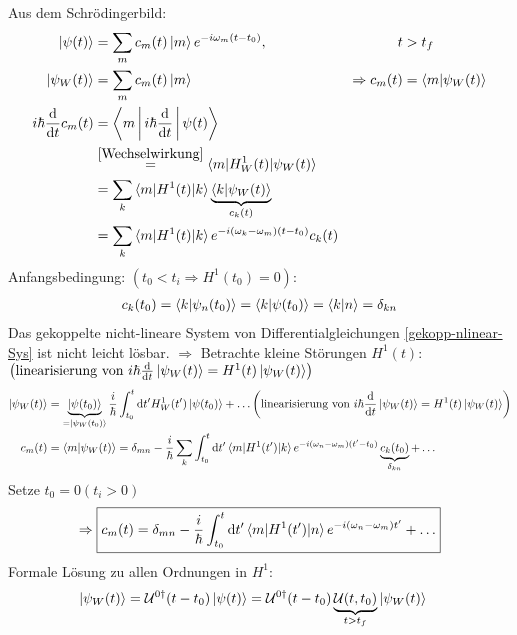 	Aus dem Schrödingerbild: 
		\begin{align}
			\ket{\psi(t)} &= \sum_m c_m(t) \ket{m} e^{-i \omega_m (t-t_0)} ,& t&>t_f \nonumber \\
			\ket{\psi_W(t)} &= \sum_m c_m(t) \ket{m} &\Rightarrow c_m(t) &= \braket{m | \psi_W(t)} \nonumber \\
			i\hbar \frac{\mathrm{d}}{\mathrm{d} t} c_m(t) 
			&= \Braket{m | i\hbar \frac{\mathrm{d}}{\mathrm{d} t} | \psi(t)} \nonumber\\
			&\overset{\eqref{Wechselwirkung}}{=} \braket{m | H^1_W(t) | \psi_W(t)} \nonumber\\
			&= \sum_k \braket{m | H^1(t) | k} \underbrace{\braket{k | \psi_W(t)}}_{\substack{c_k(t)}} \nonumber\\ 
			\label{gekopp-nlinear-Sys}
			&= \sum_k \braket{m | H^1(t) | k} e^{-i(\omega_k - \omega_m)(t - t_0)} c_k(t) 
		\end{align}
	Anfangsbedingung: $(t_0 < t_i \Rightarrow H^1(t_0) = 0):$
		\begin{align*} 
			c_k(t_0) = \braket{k | \psi_n(t_0)} = \braket{k | \psi(t_0)} = \braket{k | n} = \delta_{kn}
		\end{align*} 	
	Das gekoppelte nicht-lineare System von Differentialgleichungen \eqref{gekopp-nlinear-Sys} ist nicht leicht lösbar. $\Rightarrow$ Betrachte \glqq kleine\grqq{} Störungen $H^1(t)$: $\left( \text{linearisierung von~} i\hbar \frac{\mathrm{d}}{\mathrm{d} t} \ket{\psi_W(t)} = H^1(t) \ket{\psi_W(t)}\right) $
		\begin{align*}
			\ket{\psi_W(t)} &= \underbrace{\ket{\psi(t_0)}}_{\substack{=\ket{\psi_W(t_0)}}} 
			\frac{i}{\hbar} \int_{t_0}^{t} \mathrm{d} t' H^1_W(t') \ket{\psi(t_0)} + \ldots 
			\left( \text{linearisierung von~} i\hbar \frac{\mathrm{d}}{\mathrm{d} t} \ket{\psi_W(t)} = H^1(t) \ket{\psi_W(t)}\right) \\
			c_m(t) &= \braket{m | \psi_W(t)} 
			= \delta_{mn} - \frac{i}{\hbar} \sum_k \int_{t_0}^{t} \mathrm{d} t' \braket{m | H^1(t') | k} e^{-i(\omega_n - \omega_m)(t'-t_0)} 
			\underbrace{c_k(t_0)}_{\substack{\delta_{kn}}} + \ldots
		\end{align*}
	Setze $t_0=0 (t_i>0)$
		\begin{equation*}
			\Rightarrow \boxed{c_m(t) = \delta_{mn} 
				- \frac{i}{\hbar} \int_{t_0}^{t} \mathrm{d} t' \braket{m | H^1(t') | n} e^{-i(\omega_n - \omega_m) t'} + \ldots}
		\end{equation*}
	Formale Lösung zu allen Ordnungen in $H^1$:	
		\begin{align*}
			\ket{\psi_W(t)} &= \mathcal{U}^{0\dagger} (t-t_0) \ket{\psi(t)}
			= \mathcal{U}^{0\dagger} (t-t_0) \underbrace{\mathcal{U} (t,t_0)}_{\substack{t>t_f}} \ket{\psi_W(t)}
		\end{align*}
